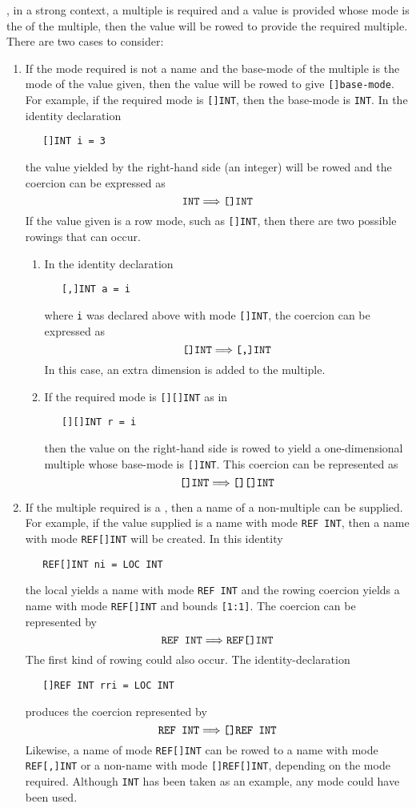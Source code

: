 , in a strong context, a multiple is required
and a value is provided whose mode is the  of the
multiple, then the value will be rowed to provide the required
multiple.  There are two cases to consider:
\begin{enumerate}
\item If the mode required is not a name and the base-mode of the
multiple is the mode of the value given, then the value will be rowed
to give \verb|[]base-mode|.  For example, if the required mode is
\verb|[]INT|, then the base-mode is \verb|INT|.  In the identity
declaration
\begin{verbatim}
   []INT i = 3
\end{verbatim}
\noindent
the value yielded by the right-hand side (an integer) will be rowed and
the coercion can be expressed as
$$\hbox{\verb|INT|\co\verb|[]INT|}$$
If the value given is a row mode, such as \verb|[]INT|, then there are
two possible rowings that can occur.
\begin{enumerate}
\item In the identity declaration
\begin{verbatim}
   [,]INT a = i
\end{verbatim}
\noindent
where \verb|i| was declared above with mode \verb|[]INT|, the coercion
can be expressed as
$$\hbox{\verb|[]INT|\co\verb|[,]INT|}$$
In this case, an extra dimension is added to the multiple.
\item If the required mode is \verb|[][]INT| as in
\begin{verbatim}
   [][]INT r = i
\end{verbatim}
\noindent
then the value on the right-hand side is rowed to yield a
one-dimensional multiple whose base-mode is \verb|[]INT|. This coercion
can be represented as
$$\hbox{\verb|[]INT|\co\verb|[][]INT|}$$
\end{enumerate}
\item If the multiple required is a , then a name of
a non-multiple can be supplied. For example, if the value supplied is
a name with mode \verb|REF INT|, then a name with mode
\verb|REF[]INT| will be created. In this identity
\begin{verbatim}
   REF[]INT ni = LOC INT
\end{verbatim}
\noindent
the local  yields a name with mode
\verb|REF INT| and the rowing coercion yields a name with mode
\verb|REF[]INT| and bounds \verb|[1:1]|. The coercion can be
represented by
$$\hbox{\verb|REF INT|\co\verb|REF[]INT|}$$
The first kind of rowing could also occur. The identity-declaration
\begin{verbatim}
   []REF INT rri = LOC INT
\end{verbatim}
\noindent
produces the coercion represented by
$$\hbox{\verb|REF INT|\co\verb|[]REF INT|}$$
Likewise, a name of mode \verb|REF[]INT| can be rowed to a name with
mode \verb|REF[,]INT| or a non-name with mode \verb|[]REF[]INT|,
depending on the mode required. Although \verb|INT| has been taken as
an example, any mode could have been used.
\end{enumerate}

